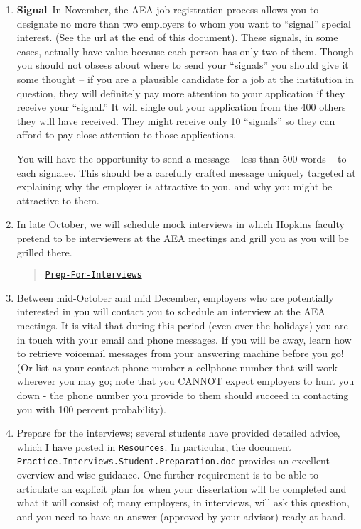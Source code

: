 \documentclass{\classes/econtex}
\begin{document}
\begin{enumerate}
\item \ifdvi\hypertarget{Signal}{\textbf{Signal}~}\fi In November, the AEA job registration process 
  allows you to designate no more than two employers to whom you want
  to ``signal'' special interest.  (See the url at the end of this
  document).  These signals, in some cases, actually have value because 
  each person has only two of them.  Though you should not obsess about 
  where to send your ``signals'' you should give it some thought -- if you
  are a plausible candidate for a job at the institution in question, they
  will definitely pay more attention to your application if they receive your 
  ``signal.''  It will single out your application from the 400 others they will have received.
  They might receive only 10 ``signals'' so they can afford to pay close attention
  to those applications.

  \hypertarget{Mock-Interviews}{}
  You will have the opportunity to send a message -- less than 500 words -- to each signalee.  This should be a carefully crafted message uniquely targeted at explaining why the employer is attractive to you, and why you might be attractive to them.

  
\item In late October, we will schedule mock interviews in which Hopkins faculty pretend to be interviewers at the AEA meetings and grill you as you will be grilled there.

  \begin{quote}
    \href{\pageurl/Steps#Prep-For-Interviews}{\texttt{Prep-For-Interviews}}
  \end{quote}

  
  
  \hypertarget{Be-Reachable}{}
\item Between mid-October and mid December, employers who are
  potentially interested in you will contact you to schedule an
  interview at the AEA meetings.  It is vital that during this period
  (even over the holidays) you are in touch with your email and phone
  messages.  If you will be away, learn how to retrieve voicemail
  messages from your answering machine before you go!  (Or list as
  your contact phone number a cellphone number that will work wherever
  you may go; note that you CANNOT expect employers to hunt you down -
  the phone number you provide to them should succeed in contacting
  you with 100 percent probability).
  
  \hypertarget{Prep-For-Interviews}{} %
\item Prepare for the interviews; several students have provided
  detailed advice, which I have posted in \href{\treeurl/Resources}{\texttt{Resources}}.  In particular, the document
  \texttt{Practice.Interviews.Student.Preparation.doc} provides an
  excellent overview and wise guidance. One further requirement is to be
  able to articulate an explicit plan for when your dissertation will
  be completed and what it will consist of; many employers, in
  interviews, will ask this question, and you need to have an answer
  (approved by your advisor) ready at hand.


\end{enumerate}
\end{document}
